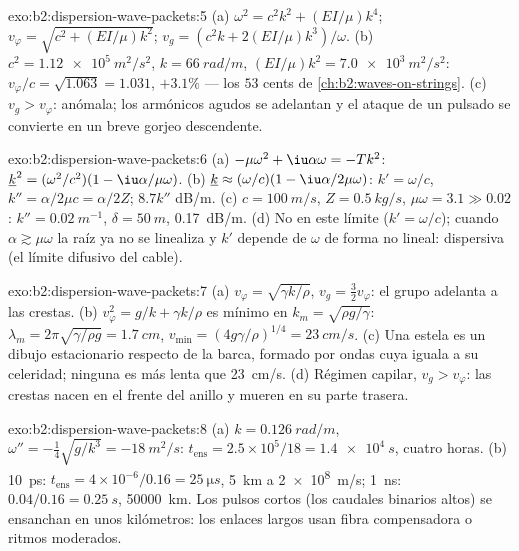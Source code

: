 \begin{solution}{exo:b2:dispersion-wave-packets:5}
(a) $\omega^2 = c^2k^2 + (EI/\mu)k^4$; $v_\varphi = \sqrt{c^2 + (EI/\mu)k^2}$; $v_g = (c^2k +
2(EI/\mu)k^3)/\omega$. (b) $c^2 = \qty{1.12e5}{m^2/s^2}$, $k = \qty{66}{rad/m}$, $(EI/\mu)k^2
= \qty{7.0e3}{m^2/s^2}$: $v_\varphi/c = \sqrt{1.063} = 1.031$, $+3.1\%$ --- los $53$ cents de
\cref{ch:b2:waves-on-strings}. (c) $v_g > v_\varphi$: anómala; los armónicos
agudos se adelantan y el ataque de un pulsado se convierte en un breve
gorjeo descendente.
\end{solution}

\begin{solution}{exo:b2:dispersion-wave-packets:6}
(a) $-\mu\omega^2 + \iu\alpha\omega = -Tk^2$: $\underline k^2 = (\omega^2/c^2)(1 - \iu\alpha/\mu\omega)$.
(b) $\underline k \approx (\omega/c)(1 - \iu\alpha/2\mu\omega)$: $k' = \omega/c$, $k'' = \alpha/2\mu c =
\alpha/2Z$; $8.7k''$ dB/m. (c) $c = \qty{100}{m/s}$, $Z = \qty{0.5}{kg/s}$, $\mu\omega = 3.1 \gg
0.02$: $k'' = \qty{0.02}{m^{-1}}$, $\delta = \qty{50}{m}$, \qty{0.17}{dB/m}. (d) No en este
límite ($k' = \omega/c$); cuando $\alpha \gtrsim \mu\omega$ la raíz ya no se
linealiza y $k'$ depende de $\omega$ de forma no lineal: dispersiva (el
límite difusivo del cable).
\end{solution}

\begin{solution}{exo:b2:dispersion-wave-packets:7}
(a) $v_\varphi = \sqrt{\gamma k/\rho}$, $v_g = \tfrac32v_\varphi$: el grupo adelanta a
las crestas. (b) $v_\varphi^2 = g/k + \gamma k/\rho$ es mínimo en $k_m = \sqrt{\rho g/\gamma}$:
$\lambda_m = 2\pi\sqrt{\gamma/\rho g} = \qty{1.7}{cm}$, $v_{\min} = (4g\gamma/\rho)^{1/4} =
\qty{23}{cm/s}$. (c) Una estela es un dibujo estacionario respecto de la
barca, formado por ondas cuya  iguala a su celeridad;
ninguna es más lenta que \qty{23}{cm/s}. (d) Régimen capilar, $v_g > v_\varphi$: las crestas
nacen en el frente del anillo y mueren en su parte trasera.
\end{solution}

\begin{solution}{exo:b2:dispersion-wave-packets:8}
(a) $k = \qty{0.126}{rad/m}$, $\omega'' = -\tfrac14\sqrt{g/k^3} = \qty{-18}{m^2/s}$: $t_{\text{ens}}
= 2.5 \times 10^5/18 = \qty{1.4e4}{s}$, cuatro horas. (b) \qty{10}{ps}: $t_{\text{ens}} =
4 \times 10^{-6}/0.16 = \qty{25}{\micro s}$, \qty{5}{km} a \qty{2e8}{m/s}; \qty{1}{ns}: $0.04/0.16 =
\qty{0.25}{s}$, \qty{50000}{km}. Los pulsos cortos (los caudales binarios altos) se
ensanchan en unos kilómetros: los enlaces largos usan fibra compensadora o ritmos moderados.
\end{solution}

